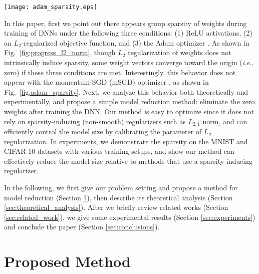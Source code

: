 \documentclass[conference]{IEEEtran}
\newcommand{\ie}{\textit{i}.\textit{e}.}
\begin{document}
\begin{figure*}[tb]
	\centerline{\texttt{[image: adam\_sparsity.eps]}}
	\caption{
		$L_2$ norm for 1000 weight vectors connecting from an input layer to a hidden layer in a 3-layer fully connected neural network (sorted in descending order). 
		The network was trained with mSGD and the Adam optimizer on the MNIST dataset with the same settings for $L_2$ regularization and number of training steps. ``Sparsity'' indicates the ratio of zero weight vectors to all vectors.
	}
	\label{fig:adam_sparsity}
\end{figure*}

In this paper, first we point out there appears group sparsity of weights during training of DNNs under the following three conditions: (1) ReLU activations, (2) an $L_2$-regularized objective function, and (3) the Adam optimizer \cite{Kingma_2015}. 
As shown in Fig.~\ref{fig:progress_l2_norm}, though $L_2$ regularization of weights does not intrinsically induce sparsity, some weight vectors converge toward the origin (\ie, zero) if these three conditions are met. 
Interestingly, this behavior does not appear with the momentum-SGD (mSGD) optimizer \cite{Qian_1999}, as shown in Fig.~\ref{fig:adam_sparsity}. 
Next, we analyze this behavior both theoretically and experimentally, and propose a simple model reduction method: eliminate the zero weights after training the DNN. 
Our method is easy to optimize since it does not rely on sparsity-inducing (non-smooth) regularizers such as $L_{2,1}$ norm, and can efficiently control the model size by calibrating the parameter of $L_2$ regularization.
In experiments, we demonstrate the sparsity on the MNIST and CIFAR-10 datasets with various training setups, and show our method can effectively reduce the model size relative to methods that use a sparsity-inducing regularizer. 

In the following, we first give our problem setting and propose a method for model reduction (Section \ref{sec:proposed_method}), then describe its theoretical analysis (Section \ref{sec:theoretical_analysis}).
After we briefly review related works (Section \ref{sec:related_work}), we give some experimental results (Section \ref{sec:experiments}) and conclude the paper (Section \ref{sec:conclusions}).

\section{Proposed Method}\label{sec:proposed_method}
\end{document}
